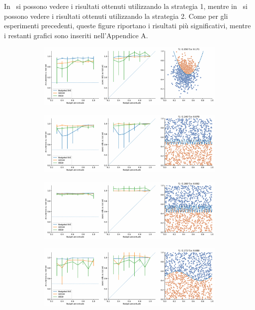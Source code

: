 In~ si possono vedere i risultati ottenuti utilizzando la strategia 1, mentre in~ si possono vedere i risultati ottenuti utilizzando la strategia 2.
Come per gli esperimenti precedenti, queste figure riportano i risultati più significativi, mentre i restanti grafici sono inseriti nell'Appendice A.
\begin{figure}[b!]
\centering
    \begin{subfigure}{.9\textwidth}
        \centering
        \includegraphics[width=\textwidth]{img/comp_old/3.pdf}
    \end{subfigure}%
    \hfill
    \begin{subfigure}{.9\textwidth}
        \centering
        \includegraphics[width=\textwidth]{img/comp_old/8.pdf}
    \end{subfigure}
    \hfill
    \begin{subfigure}{.9\textwidth}
        \centering
        \includegraphics[width=\textwidth]{img/comp_old/9.pdf}
    \end{subfigure}%
    \hfill
    \begin{subfigure}{.9\textwidth}
        \centering
        \includegraphics[width=\textwidth]{img/comp_old/10.pdf}

\end{subfigure}
\end{figure}
